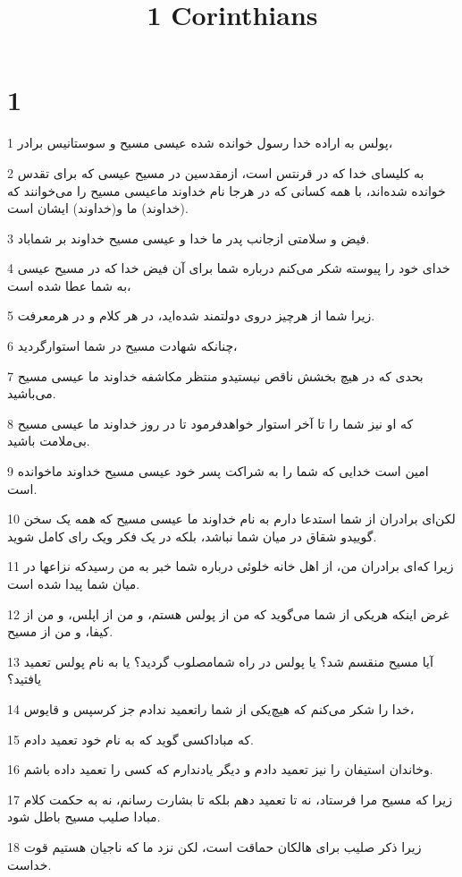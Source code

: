 

\title{1 Corinthians}


\chapter{1}

\par 1 پولس به اراده خدا رسول خوانده شده عیسی مسیح و سوستانیس برادر،
\par 2 به کلیسای خدا که در قرنتس است، ازمقدسین در مسیح عیسی که برای تقدس خوانده شده‌اند، با همه کسانی که در هرجا نام خداوند ماعیسی مسیح را می‌خوانند که (خداوند) ما و(خداوند) ایشان است.
\par 3 فیض و سلامتی ازجانب پدر ما خدا و عیسی مسیح خداوند بر شماباد.
\par 4 خدای خود را پیوسته شکر می‌کنم درباره شما برای آن فیض خدا که در مسیح عیسی به شما عطا شده است،
\par 5 زیرا شما از هرچیز دروی دولتمند شده‌اید، در هر کلام و در هرمعرفت.
\par 6 چنانکه شهادت مسیح در شما استوارگردید،
\par 7 بحدی که در هیچ بخشش ناقص نیستیدو منتظر مکاشفه خداوند ما عیسی مسیح می‌باشید.
\par 8 که او نیز شما را تا آخر استوار خواهدفرمود تا در روز خداوند ما عیسی مسیح بی‌ملامت باشید.
\par 9 امین است خدایی که شما را به شراکت پسر خود عیسی مسیح خداوند ماخوانده است.
\par 10 لکن‌ای برادران از شما استدعا دارم به نام خداوند ما عیسی مسیح که همه یک سخن گوییدو شقاق در میان شما نباشد، بلکه در یک فکر ویک رای کامل شوید.
\par 11 زیرا که‌ای برادران من، از اهل خانه خلوئی درباره شما خبر به من رسیدکه نزاعها در میان شما پیدا شده است.
\par 12 غرض اینکه هریکی از شما می‌گوید که من از پولس هستم، و من از اپلس، و من از کیفا، و من از مسیح.
\par 13 آیا مسیح منقسم شد؟ یا پولس در راه شمامصلوب گردید؟ یا به نام پولس تعمید یافتید؟
\par 14 خدا را شکر می‌کنم که هیچ‌یکی از شما راتعمید ندادم جز کرسپس و قایوس،
\par 15 که مباداکسی گوید که به نام خود تعمید دادم.
\par 16 وخاندان استیفان را نیز تعمید دادم و دیگر یادندارم که کسی را تعمید داده باشم.
\par 17 زیرا که مسیح مرا فرستاد، نه تا تعمید دهم بلکه تا بشارت رسانم، نه به حکمت کلام مبادا صلیب مسیح باطل شود.
\par 18 زیرا ذکر صلیب برای هالکان حماقت است، لکن نزد ما که ناجیان هستیم قوت خداست.
